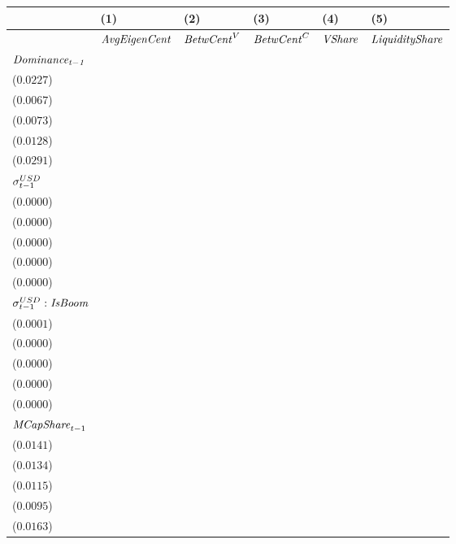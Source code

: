 \begin{tabular}{llllll}
\toprule
{} &                                       (1) &                                       (2) &                                       (3) &                                       (4) &                                       (5) \\
\midrule
                                        &                      ${\it AvgEigenCent}$ &                        ${\it BetwCent}^V$ &                        ${\it BetwCent}^C$ &                            ${\it VShare}$ &                    ${\it LiquidityShare}$ \\
$\it Dominance_{t-1}$                   &   \makecell{$0.8349^{***}$ \\ ($0.0227$)} &   \makecell{$0.9507^{***}$ \\ ($0.0067$)} &   \makecell{$0.9515^{***}$ \\ ($0.0073$)} &   \makecell{$0.8831^{***}$ \\ ($0.0128$)} &   \makecell{$0.9222^{***}$ \\ ($0.0291$)} \\
${\it \sigma}^{USD}_{t-1}$              &   \makecell{$-0.0001^{**}$ \\ ($0.0000$)} &      \makecell{$0.0000^{}$ \\ ($0.0000$)} &      \makecell{$0.0000^{}$ \\ ($0.0000$)} &   \makecell{$-0.0000^{**}$ \\ ($0.0000$)} &   \makecell{$-0.0000^{**}$ \\ ($0.0000$)} \\
${\it \sigma}^{USD}_{t-1}:{\it IsBoom}$ &   \makecell{$0.0002^{***}$ \\ ($0.0001$)} &     \makecell{$-0.0000^{}$ \\ ($0.0000$)} &     \makecell{$-0.0000^{}$ \\ ($0.0000$)} &   \makecell{$0.0000^{***}$ \\ ($0.0000$)} &    \makecell{$0.0000^{**}$ \\ ($0.0000$)} \\
${\it MCapShare}_{t-1}$                 &      \makecell{$0.0124^{}$ \\ ($0.0141$)} &    \makecell{$0.0333^{**}$ \\ ($0.0134$)} &   \makecell{$0.0360^{***}$ \\ ($0.0115$)} &   \makecell{$0.0311^{***}$ \\ ($0.0095$)} &   \makecell{$0.0429^{***}$ \\ ($0.0163$)} \\

\end{tabular}
